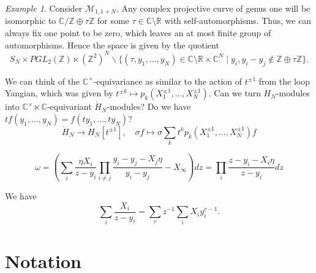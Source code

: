 \documentclass[11pt]{report}
\theoremstyle{definition}
\theoremstyle{remark}
\theoremstyle{remark}
\newtheorem*{example}{Example}
\newcommand{\Z}{\mathbb{Z}}
\newcommand{\R}{\mathbb{R}}
\newcommand{\C}{\mathbb{C}}
\begin{document}
\begin{example}
Consider $\mathcal{M}_{1,1+N}$. Any complex projective curve of genus one will be isomorphic to $\C/\Z \oplus \tau \Z$ for some $\tau \in \C \setminus \R$ with self-automorphisms. Thus, we can always fix one point to be zero, which leaves an at most finite group of automorphisms. Hence the space is given by the quotient
\begin{equation*}
S_N \times PGL_2(\Z) \ltimes (\Z^2)^N \backslash \{ (\tau,y_1,...,y_N) \in \C \setminus \R \times \C^N \mid y_i,y_i-y_j \notin \Z \oplus \tau \Z \}.
\end{equation*}
\end{example}

We can think of the $\C^\times$-equivariance as similar to the action of $t^{\pm 1}$ from the loop Yangian, which was given by $t^{\pm k} \mapsto p_k(X_1^{\pm 1},...,X_N^{\pm 1})$. Can we turn $\ddot H_N$-modules into $\C^\times \ltimes \C$-equivariant $\dot H_N$-modules? Do we have $t f(y_1,...,y_N) = f(ty_1,...,ty_N)$?
\begin{equation*}
\dot H_N \to \dot H_N[t^{\pm 1}], \quad \sigma f \mapsto \sigma \sum_k t^k p_k(X_1^{\pm 1},...,X_N^{\pm 1}) f
\end{equation*}

\begin{equation*}
\omega = \left( \sum_i \frac{\eta X_i}{z-y_i} \prod_{i \neq j} \frac{y_i-y_j-X_j\eta}{y_i-y_j} - X_\infty \right) dz = \prod_i \frac{z-y_i-X_i\eta}{z-y_i} dz
\end{equation*}

We have
\begin{equation*}
\sum_i \frac{X_i}{z-y_i} = \sum_r z^{-1} \sum_i X_i y_i^{r-1}.
\end{equation*}


\chapter*{Notation}\label{chapter:notation}
\end{document}
